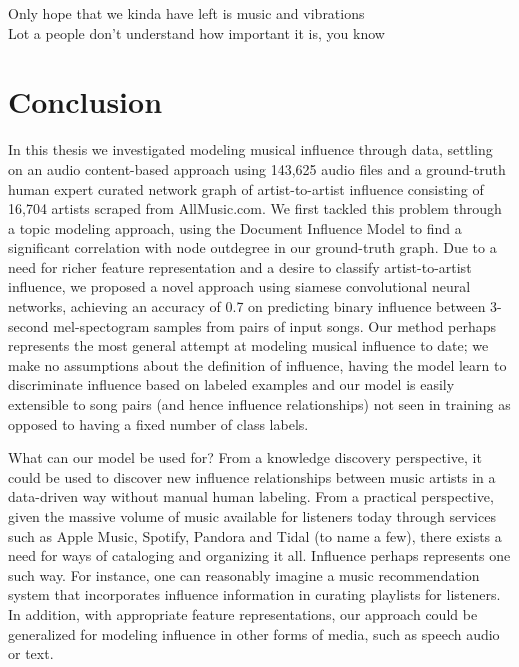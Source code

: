 \begin{savequote}[75mm] 
Only hope that we kinda have left is music and vibrations\\
Lot a people don’t understand how important it is, you know
\end{savequote}

\chapter{Conclusion}

In this thesis we investigated modeling musical influence through data, settling on an audio content-based approach using 143,625 audio files and a ground-truth human expert curated network graph of artist-to-artist influence consisting of 16,704 artists scraped from AllMusic.com. We first tackled this problem through a topic modeling approach, using the Document Influence Model to find a significant correlation with node outdegree in our ground-truth graph. Due to a need for richer feature representation and a desire to classify artist-to-artist influence, we proposed a novel approach using siamese convolutional neural networks, achieving an accuracy of 0.7 on predicting binary influence between 3-second mel-spectogram samples from pairs of input songs. Our method perhaps represents the most general attempt at modeling musical influence to date; we make no assumptions about the definition of influence, having the model learn to discriminate influence based on labeled examples and our model is easily extensible to song pairs (and hence influence relationships) not seen in training as opposed to having a fixed number of class labels.

What can our model be used for? From a knowledge discovery perspective, it could be used to discover new influence relationships between music artists in a data-driven way without manual human labeling. From a practical perspective, given the massive volume of music available for listeners today through services such as Apple Music, Spotify, Pandora and Tidal (to name a few), there exists a need for ways of cataloging and organizing it all. Influence perhaps represents one such way. For instance, one can reasonably imagine a music recommendation system that incorporates influence information in curating playlists for listeners. In addition, with appropriate feature representations, our approach could be generalized for modeling influence in other forms of media, such as speech audio or text.

